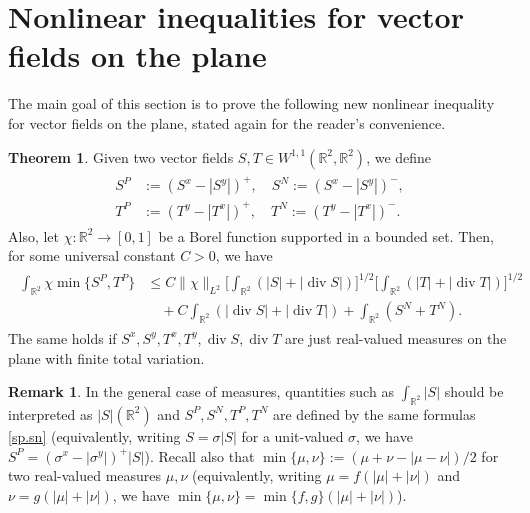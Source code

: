 \documentclass[11pt,a4paper]{amsart}
\newcommand{\R}{\mathbb{R}}
\theoremstyle{definition}
\newtheorem{rmk}[definition]{Remark}
\newtheorem{thm}[definition]{Theorem}
\DeclareMathOperator{\dive}{div}
\begin{document}
\section{Nonlinear inequalities for vector fields on the plane}\label{sec.nonlinear}

The main goal of this section is to prove the following new nonlinear inequality for vector fields on the plane, stated again for the reader's convenience.


\begin{thm}\label{main.tw}
	Given two vector fields $S,T\in W^{1,1}(\R^2,\R^2)$, we define
	\begin{align}\label{sp.sn}
		\begin{aligned}
		S^P&:=(S^x-|S^y|)^+,\quad S^N:=(S^x-|S^y|)^-, \\
		T^P&:=(T^y-|T^x|)^+,\quad T^N:=(T^y-|T^x|)^-.
		\end{aligned}
	\end{align}
    Also, let $\chi:\R^2\to[0,1]$ be a Borel function supported in a bounded set. %
    Then, for some universal constant $C>0$, we have
	\begin{align}\label{kak.bis}
        \begin{aligned}
		\int_{\R^2} \chi \min\{S^P,T^P\}
		&\le C\|\chi\|_{L^2}\Big[\int_{\R^2}(|S|+\lvert \dive S\rvert)\Big]^{1/2}\Big[\int_{\R^2}(|T|+\lvert \dive T\rvert)\Big]^{1/2} \\
		&\quad+C\int_{\R^2} (\lvert \dive S\rvert+\lvert \dive T\rvert)
        +\int_{\R^2}(S^N+T^N).
        \end{aligned}
	\end{align}
    The same holds if $S^x,S^y,T^x,T^y,\dive S,\dive T$ are just real-valued measures on the plane with finite total variation. %
\end{thm}

\begin{rmk}
    In the general case of measures, quantities such as $\int_{\R^2}|S|$ should be interpreted as $|S|(\R^2)$ and $S^P,S^N,T^P,T^N$ are defined by the same formulas \cref{sp.sn}
    (equivalently, writing $S=\sigma|S|$ for a unit-valued $\sigma$, we have $S^P=(\sigma^x-|\sigma^y|)^+|S|$). Recall also that $\min\{\mu,\nu\}:=(\mu+\nu-|\mu-\nu|)/2$
    for two real-valued measures $\mu,\nu$ (equivalently, writing $\mu=f(|\mu|+|\nu|)$ and
    $\nu=g(|\mu|+|\nu|)$, we have $\min\{\mu,\nu\}=\min\{f,g\}(|\mu|+|\nu|)$).
\end{rmk}
\end{document}
